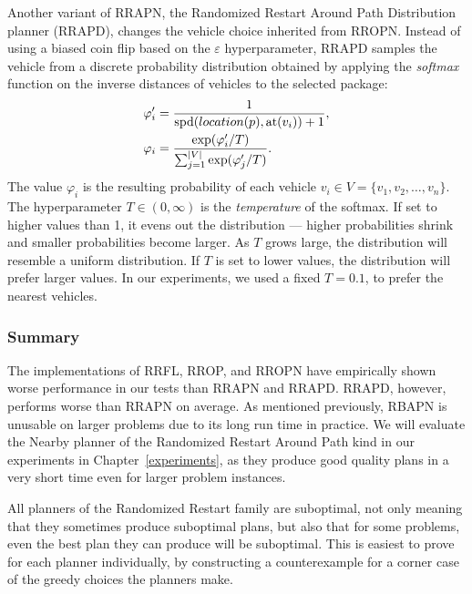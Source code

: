 Another variant of RRAPN, the
Randomized Restart Around Path Distribution planner (RRAPD),
changes the vehicle choice inherited from RROPN.
Instead of using a biased coin flip based on the $\varepsilon$
hyperparameter, RRAPD samples the vehicle
from a discrete probability distribution
obtained by applying the \textit{softmax} function on the inverse distances of vehicles to the selected package:
\begin{align*}
\varphi'_i &= \frac{1}{\textrm{spd}(location(p), \textrm{at}(v_i)) + 1},\\
\varphi_i &= \frac{\exp(\varphi'_i/T)}{\sum_{j = 1}^{|V|} \exp(\varphi'_j/T)}.
\end{align*}
The value $\varphi_i$ is the resulting probability of each vehicle $v_i \in V = \{v_1, v_2, \ldots, v_n\}$.
The hyperparameter $T \in (0, \infty)$ is the \textit{temperature}
of the softmax. If set to higher values than 1, it
evens out the distribution --- higher probabilities shrink
and smaller probabilities become larger.
As $T$ grows large, the distribution will resemble a uniform distribution.
If $T$ is set to lower values, the distribution will prefer larger values.
In our experiments, we used a fixed $T = 0.1$, to prefer the nearest vehicles.

\subsubsection{Summary}

The implementations
of RRFL, RROP, and RROPN have empirically shown
worse performance in our tests than RRAPN and RRAPD.
RRAPD, however, performs worse than RRAPN on
average.
As mentioned previously, RBAPN is unusable on larger
problems due to its long run time in practice.
We will evaluate the Nearby planner
of the Randomized Restart Around Path
kind in our experiments in Chapter~\ref{experiments},
as they produce good quality plans in a very short time
even for larger problem instances.

All planners of the Randomized Restart family
are suboptimal, not only meaning that they sometimes produce
suboptimal plans, but also that for some problems,
even the best plan they can produce will be suboptimal.
This is easiest to prove for each planner individually,
by constructing a counterexample for a corner
case of the
greedy
choices
the planners make.



























